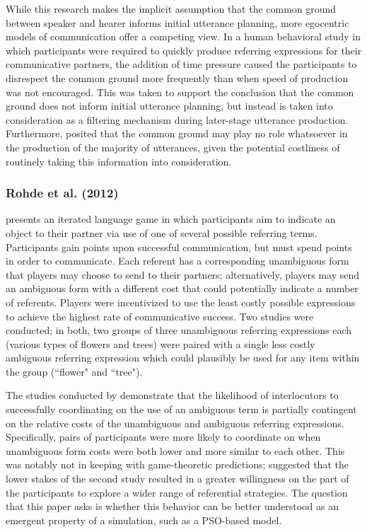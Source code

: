 \documentclass[11pt]{article}
\begin{document}
While this research makes the implicit assumption that the common ground between speaker and hearer informs initial utterance planning, more egocentric models of communication offer a competing view. In a human behavioral study \citep{horton1996} in which participants were required to quickly produce referring expressions for their communicative partners, the addition of time pressure caused the participants to disrespect the common ground more frequently than when speed of production was not encouraged. This was taken to support the conclusion that the common ground does not inform initial utterance planning, but instead is taken into consideration as a filtering mechanism during later-stage utterance production. Furthermore, \cite{horton1996} posited that the common ground may play no role whatsoever in the production of the majority of utterances, given the potential costliness of routinely taking this information into consideration.

\subsubsection{Rohde et al. (2012)}
\cite{rohde2012} presents an iterated language game in which participants aim to indicate an object to their partner via use of one of several possible referring terms. Participants gain points upon successful communication, but must spend points in order to communicate. Each referent has a corresponding unambiguous form that players may choose to send to their partners; alternatively, players may send an ambiguous form with a different cost that could potentially indicate a number of referents. Players were incentivized to use the least costly possible expressions to achieve the highest rate of communicative success. Two studies were conducted; in both, two groups of three unambiguous referring expressions each (various types of flowers and trees) were paired with a single less costly ambiguous referring expression which could plausibly be used for any item within the group (``flower" and ``tree"). 

The studies conducted by \citeauthor{rohde2012} demonstrate that the likelihood of interlocutors to successfully coordinating on the use of an ambiguous term is partially contingent on the relative costs of the unambiguous and ambiguous referring expressions. Specifically, pairs of participants were more likely to coordinate on when unambiguous form costs were both lower and more similar to each other. This was notably not in keeping with game-theoretic predictions; \citeauthor{rohde2012} suggested that the lower stakes of the second study resulted in a greater willingness on the part of the participants to explore a wider range of referential strategies. The question that this paper asks is whether this behavior can be better understood as an emergent property of a simulation, such as a PSO-based model.
\end{document}
